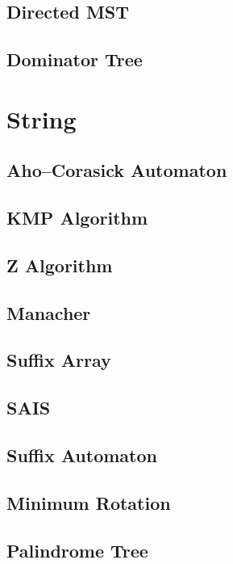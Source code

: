 \subsection{Directed MST}

\subsection{Dominator Tree}


\section{String}
\subsection{Aho–Corasick Automaton}

\subsection{KMP Algorithm}

\subsection{Z Algorithm}

\subsection{Manacher}

\subsection{Suffix Array}

\subsection{SAIS}

\subsection{Suffix Automaton}

\subsection{Minimum Rotation}

\subsection{Palindrome Tree}


